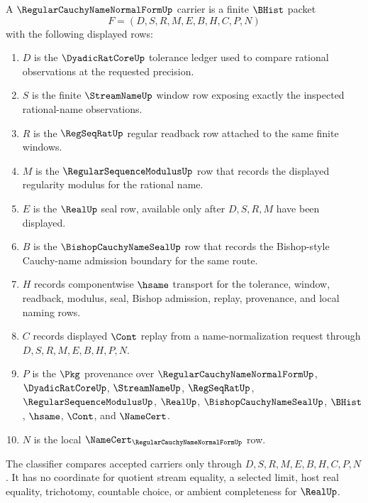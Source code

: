 \begin{definition}
\label{def:regular-cauchy-name-normal-form-carrier}
A $\RegularCauchyNameNormalFormUp$ carrier is a finite $\BHist$ packet
$$
F=(D,S,R,M,E,B,H,C,P,N)
$$
with the following displayed rows:
\begin{enumerate}
\item $D$ is the $\DyadicRatCoreUp$ tolerance ledger used to compare rational observations at the requested precision.
\item $S$ is the finite $\StreamNameUp$ window row exposing exactly the inspected rational-name observations.
\item $R$ is the $\RegSeqRatUp$ regular readback row attached to the same finite windows.
\item $M$ is the $\RegularSequenceModulusUp$ row that records the displayed regularity modulus for the rational name.
\item $E$ is the $\RealUp$ seal row, available only after $D,S,R,M$ have been displayed.
\item $B$ is the $\BishopCauchyNameSealUp$ row that records the Bishop-style Cauchy-name admission boundary for the same route.
\item $H$ records componentwise $\hsame$ transport for the tolerance, window, readback, modulus, seal, Bishop admission, replay, provenance, and local naming rows.
\item $C$ records displayed $\Cont$ replay from a name-normalization request through $D,S,R,M,E,B,H,P,N$.
\item $P$ is the $\Pkg$ provenance over $\RegularCauchyNameNormalFormUp$, $\DyadicRatCoreUp$, $\StreamNameUp$, $\RegSeqRatUp$, $\RegularSequenceModulusUp$, $\RealUp$, $\BishopCauchyNameSealUp$, $\BHist$, $\hsame$, $\Cont$, and $\NameCert$.
\item $N$ is the local $\NameCert_{\RegularCauchyNameNormalFormUp}$ row.
\end{enumerate}
The classifier compares accepted carriers only through $D,S,R,M,E,B,H,C,P,N$. It has no coordinate for quotient stream equality, a selected limit, host real equality, trichotomy, countable choice, or ambient completeness for $\RealUp$.
\end{definition}


